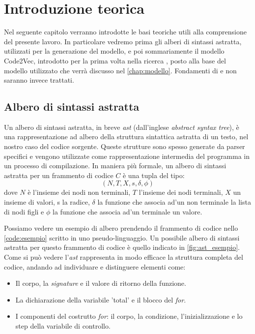 \chapter{Introduzione teorica}\label{chap:introduzione_teorica}
Nel seguente capitolo verranno introdotte le basi teoriche utili alla comprensione del presente lavoro.
In particolare vedremo prima gli alberi di sintassi astratta, utilizzati per la generazione del modello, e poi sommariamente il modello Code2Vec, introdotto per la prima volta nella ricerca \cite{alon2019code2vec}, posto alla base del modello utilizzato che verrà discusso nel \autoref{chap:modello}.
Fondamenti di \ML{} e \DL{} non saranno invece trattati. 

\section{Albero di sintassi astratta}
Un albero di sintassi astratta, in breve \textit{ast} (dall'inglese \textit{abstract syntax tree}), è una rappresentazione ad albero della struttura sintattica astratta di un testo, nel nostro caso del codice sorgente.
Queste strutture sono spesso generate da parser specifici e vengono utilizzate come rappresentazione intermedia del programma in un processo di compilazione.
In maniera più formale, un albero di sintassi astratta per un frammento di codice $C$ è una tupla del tipo:
    \[(N, T, X, s, \delta, \phi)\]
dove $N$ è l'insieme dei nodi non terminali, $T$ l'insieme dei nodi terminali, $X$ un insieme di valori, s la radice,  $\delta$ la funzione che associa ad'un non terminale la lista di nodi figli e $\phi$ la funzione che associa ad'un terminale un valore.

Possiamo vedere un esempio di albero prendendo il frammento di codice nello \autoref{code:esempio} scritto in uno pseudo-linguaggio.
Un possibile albero di sintassi astratta per questo frammento di codice è quello indicato in \autoref{fig:ast_esempio}.
Come si può vedere l'\textit{ast} rappresenta in modo efficace la struttura completa del codice, andando ad individuare e distinguere elementi come:
  \begin{itemize}
    \item Il corpo, la \textit{signature} e il valore di ritorno della funzione. 
    \item La dichiarazione della variabile 'total' e il blocco del \textit{for}.
    \item I componenti del costrutto \textit{for}: il corpo, la condizione, l'inizializzazione e lo step della variabile di controllo.
  \end{itemize}

